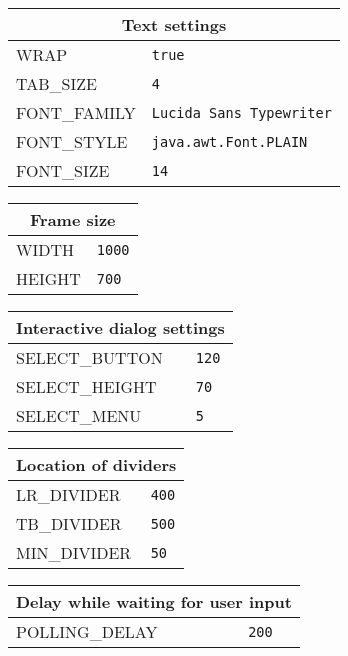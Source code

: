 \documentclass[11pt]{article}
\begin{document}
\begin{center}
\bigskip

\begin{tabular}{|p{}|p{}|}
\hline
\multicolumn{2}{|c|}{Text settings}\\ \hline
\textsc{\ttfamily WRAP} &\verb+true+\\
\textsc{\ttfamily TAB\_SIZE} &\verb+4+\\
\textsc{\ttfamily FONT\_FAMILY} & \verb+Lucida Sans Typewriter+\\ 
\textsc{\ttfamily FONT\_STYLE} & \verb+java.awt.Font.PLAIN+\\
\textsc{\ttfamily FONT\_SIZE} & \verb+14+\\\hline
\end{tabular}

\bigskip

\begin{tabular}{|p{}|p{}|}
\hline
\multicolumn{2}{|c|}{Frame size}\\ \hline
\textsc{\ttfamily WIDTH} &\verb+1000+\\
\textsc{\ttfamily HEIGHT} &\verb+700+\\\hline
\end{tabular}

\bigskip

\begin{tabular}{|p{}|p{}|}
\hline
\multicolumn{2}{|c|}{Interactive dialog settings}\\ \hline
\textsc{\ttfamily SELECT\_BUTTON} &\verb+120+\\
\textsc{\ttfamily SELECT\_HEIGHT} &\verb+70+\\
\textsc{\ttfamily SELECT\_MENU} &\verb+5+\\\hline
\end{tabular}

\bigskip

\begin{tabular}{|p{}|p{}|}
\hline
\multicolumn{2}{|c|}{Location of dividers}\\ \hline
\textsc{\ttfamily LR\_DIVIDER} &\verb+400+\\
\textsc{\ttfamily TB\_DIVIDER} &\verb+500+\\
\textsc{\ttfamily MIN\_DIVIDER} &\verb+50+\\\hline
\end{tabular}

\bigskip

\begin{tabular}{|p{}|p{}|}
\hline
\multicolumn{2}{|c|}{Delay while waiting for user input}\\ \hline
\textsc{\ttfamily POLLING\_DELAY} &\verb+200+\\\hline
\end{tabular}

\end{center}
\end{document}
